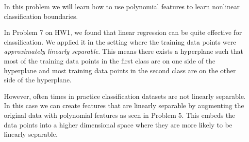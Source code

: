 \documentclass{article}\usepackage[utf8]{inputenc}\usepackage[margin=0.4cm,top=0.4cm,bottom=0.4cm]{geometry}\usepackage[usenames,dvipsnames,svgnames,table]{xcolor}
\begin{document}
\noindent In this problem we will learn how to use polynomial features to learn nonlinear classification boundaries.
\vspace{4pt}

\noindent In Problem 7 on HW1, we found that linear regression can be quite effective for classification. We applied it in the setting where the training data points were \textit{approximately linearly separable}. This means there exists a hyperplane such that most of the training data points in the first class are on one side of the hyperplane and most training data points in the second class are on the other side of the hyperplane.
\vspace{4pt}

\noindent However, often times in practice classification datasets are not linearly separable. In this case we can create features that are linearly separable by augmenting the original data with polynomial features as seen in Problem 5. This embeds the data points into a higher dimensional space where they are more likely to be linearly separable.
\vspace{4pt}
\end{document}
